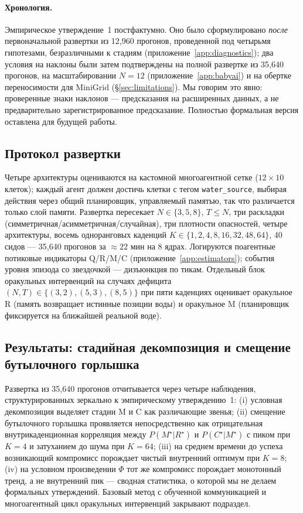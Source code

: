 \documentclass{article}
\begin{document}
\paragraph{Хронология.}
Эмпирическое утверждение~1 постфактумно. Оно было сформулировано \emph{после} первоначальной развертки из 12{,}960 прогонов, проведенной под четырьмя гипотезами, безразличными к стадиям (приложение~\ref{app:diagnostics}); два условия на наклоны были затем подтверждены на полной развертке из 35{,}640 прогонов, на масштабировании $N\!=\!12$ (приложение~\ref{app:babyai}) и на обертке переносимости для MiniGrid (\S\ref{sec:limitations}). Мы говорим это явно: проверенные знаки наклонов --- предсказания на расширенных данных, а не предварительно
зарегистрированное предсказание. Полностью формальная версия оставлена для будущей работы.

\subsection{Протокол развертки}
\label{sec:multi-agent-protocol}

Четыре архитектуры оцениваются на кастомной многоагентной сетке ($12{\times}10$ клеток); каждый агент должен достичь клетки с тегом \texttt{water\_source}, выбирая действия через общий планировщик, управляемый памятью, так что различается только слой памяти. Развертка пересекает $N{\in}\{3,5,8\}$, $T{\le}N$, три раскладки (симметричная/асимметричная/случайная), три плотности опасностей, четыре архитектуры, восемь одноранговых каденций $K{\in}\{1,2,4,8,16,32,48,64\}$, 40 сидов --- 35{,}640 прогонов за $\approx 22$ мин на 8 ядрах. Логируются поагентные потиковые индикаторы Q/R/M/C (приложение~\ref{app:estimators}); события уровня эпизода со звездочкой --- дизъюнкция по тикам. Отдельный блок оракульных интервенций на случаях дефицита $(N,T){\in}\{(3,2),(5,3),(8,5)\}$ при пяти каденциях оценивает оракульное R (память возвращает истинные позиции воды) и оракульное M (планировщик фиксируется на ближайшей реальной воде).

\subsection{Результаты: стадийная декомпозиция и смещение бутылочного горлышка}
\label{sec:multi-agent-results}

Развертка из 35{,}640 прогонов отчитывается через четыре наблюдения,
структурированных зеркально к эмпирическому утверждению~1: (i) условная
декомпозиция выделяет стадии M и C как различающие
звенья; (ii) смещение бутылочного горлышка проявляется непосредственно как отрицательная
внутрикаденционная корреляция между $P(M^\star|R^\star)$ и
$P(C^\star|M^\star)$ с пиком при $K\!=\!4$ и затуханием до шума при
$K\!=\!64$; (iii) на среднем времени до успеха возникающий компромисс
порождает чистый внутренний оптимум при $K\!=\!8$; (iv) на
условном произведении $\Phi$ тот же компромисс порождает монотонный
тренд, а не внутренний пик --- сводная статистика, о которой мы не делаем формальных утверждений. Базовый метод с обученной коммуникацией и многоагентный
цикл оракульных интервенций закрывают подраздел.
\end{document}
